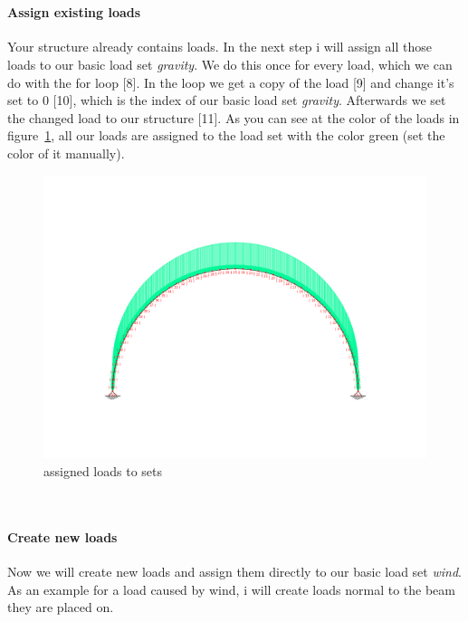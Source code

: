 \vspace{20pt}\\
\begin{minipage}[h]{\textwidth-8cm}
\paragraph{Assign existing loads} Your structure already contains loads. In the next step i will assign all those loads to our basic load set \textit{gravity}. We do this once for every load, which we can do with the for loop [8]. In the loop we get a copy of the load [9] and change it's set to 0 [10], which is the index of our basic load set \textit{gravity}. Afterwards we set the changed load to our structure [11]. As you can see at the color of the loads in figure~\ref{pic:scriptsetset}, all our loads are assigned to the load set with the color green (set the color of it manually).
\end{minipage}
\hfill
\begin{minipage}[h]{8cm}
\begin{figure}[H]
\begin{center}
\includegraphics[width=\textwidth-1cm]{../pictures/scriptsetset.png}
\caption{assigned loads to sets}
\label{pic:scriptsetset}
\end{center}
\end{figure}
\end{minipage}
\vspace{20pt}\\
\begin{minipage}[h]{\textwidth-8cm}
\paragraph{Create new loads} Now we will create new loads and assign them directly to our basic load set \textit{wind}. As an example for a load caused by wind, i will create loads normal to the beam they are placed on.
\end{minipage}

